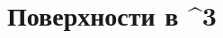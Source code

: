 \documentclass[../main.tex]{subfiles}
\begin{document}
 \chapter{Поверхности в \R^3}
 
\end{document}
